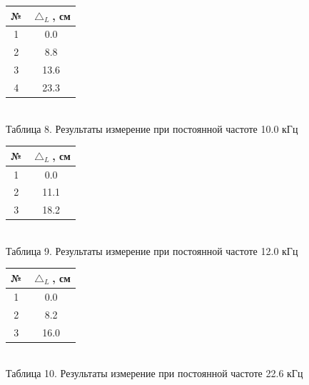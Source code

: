 \documentclass[a4paper, 12pt]{article}
\begin{document}
	\begin{center}
		\begin{tabular} {|c | c |}
			\hline	
			№ & $\bigtriangleup_L$, см\\
			\hline
			1& 0.0\\
			\hline
			2& 8.8\\
			\hline
			3& 13.6\\
			\hline
			4& 23.3\\
			\hline
		\end{tabular}\\
	Таблица 8. Результаты измерение при постоянной частоте 10.0 кГц
	\end{center}

	\begin{center}
		\begin{tabular} {|c | c |}
		\hline	
		№ & $\bigtriangleup_L$, см\\
		\hline
		1& 0.0\\
		\hline
		2& 11.1\\
		\hline
		3& 18.2\\
		\hline
		\end{tabular}\\
		Таблица 9. Результаты измерение при постоянной частоте 12.0 кГц
	\end{center}

	\begin{center}
		\begin{tabular} {|c | c |}
		\hline	
		№ & $\bigtriangleup_L$, см\\
		\hline
		1& 0.0\\
		\hline
		2& 8.2\\
		\hline
		3& 16.0\\
		\hline
		\end{tabular}\\
	Таблица 10. Результаты измерение при постоянной частоте 22.6 кГц
	\end{center}
\end{document}
